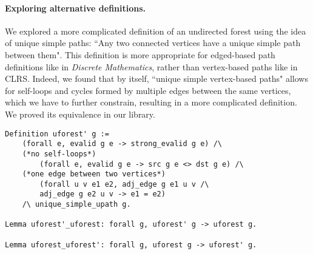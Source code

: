 \paragraph{Exploring alternative definitions.} We explored a more complicated definition of an undirected forest using the idea of unique simple paths: ``Any two connected vertices have a unique simple path between them". This definition is more appropriate for edged-based path definitions like in \textit{Discrete Mathematics}, rather than vertex-based paths like in CLRS. Indeed, we found that by itself, ``unique simple vertex-based paths" allows for self-loops and cycles formed by multiple edges between the same vertices, which we have to further constrain, resulting in a more complicated definition. We proved its equivalence in our library.
\begin{lstlisting}
Definition uforest' g :=
	(forall e, evalid g e -> strong_evalid g e) /\
	(*no self-loops*)
		(forall e, evalid g e -> src g e <> dst g e) /\
	(*one edge between two vertices*)
 		(forall u v e1 e2, adj_edge g e1 u v /\
		adj_edge g e2 u v -> e1 = e2)
	/\ unique_simple_upath g.

Lemma uforest'_uforest: forall g, uforest' g -> uforest g.

Lemma uforest_uforest': forall g, uforest g -> uforest' g.
\end{lstlisting}